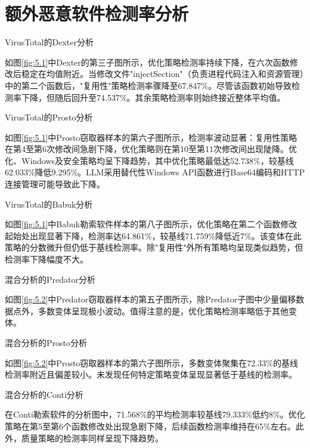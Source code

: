 \chapter{额外恶意软件检测率分析}
VirusTotal的Dexter分析

如图\ref{fig:5.1}中Dexter的第三子图所示，优化策略检测率持续下降，在六次函数修改后稳定在均值附近。当修改文件"injectSection"（负责进程代码注入和资源管理）中的第二个函数后，"复用性"策略检测率骤降至67.847\%。尽管该函数初始导致检测率下降，但随后回升至74.537\%。其余策略检测率则始终接近整体平均值。

VirusTotal的Prosto分析

如图\ref{fig:5.1}中Prosto窃取器样本的第六子图所示，检测率波动显著：复用性策略在第4至第6次修改间急剧下降，优化策略则在第10至第11次修改间出现陡降。优化、Windows及安全策略均呈下降趋势，其中优化策略最低达52.738\%，较基线62.033\%降低9.295\%。LLM采用替代性Windows API函数进行Base64编码和HTTP连接管理可能导致此下降。

VirusTotal的Babuk分析

如图\ref{fig:5.1}中Babuk勒索软件样本的第八子图所示，优化策略在第二个函数修改起始处出现显著下降，检测率达64.861\%，较基线71.759\%降低近7\%。该变体在此策略的分数微升但仍低于基线检测率。除"复用性"外所有策略均呈现类似趋势，但检测率下降幅度不大。

混合分析的Predator分析

如图\ref{fig:5.2}中Predator窃取器样本的第五子图所示，除Predator子图中少量偏移数据点外，多数变体呈现极小波动。值得注意的是，优化策略检测率略低于其他变体。

混合分析的Prosto分析

如图\ref{fig:5.2}中Prosto窃取器样本的第六子图所示，多数变体聚集在72.33\%的基线检测率附近且偏差较小。未发现任何特定策略变体呈现显著低于基线的检测率。

混合分析的Conti分析

在Conti勒索软件的分析图中，71.568\%的平均检测率较基线79.333\%低约8\%。优化策略在第5至第6个函数修改处出现急剧下降，后续函数检测率维持在65\%左右。此外，质量策略的检测率同样呈现下降趋势。